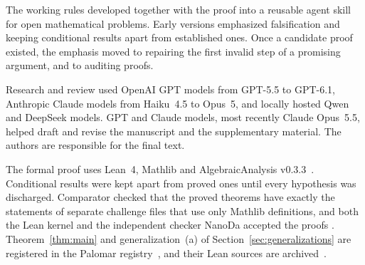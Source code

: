 \documentclass[pdflatex,sn-mathphys-num]{sn-jnl}
\numberwithin{equation}{section}
\theoremstyle{thmstyleone}
\theoremstyle{thmstyletwo}
\begin{document}
\begin{appendices}
The working rules developed together with the proof into a reusable
agent skill for open mathematical problems. Early versions emphasized
falsification and keeping conditional results apart from established ones.
Once a candidate proof existed, the emphasis moved to repairing the first
invalid step of a promising argument, and
to auditing proofs.

Research and review used OpenAI GPT models from GPT-5.5 to GPT-6.1,
Anthropic Claude models from Haiku~4.5 to Opus~5, and locally hosted Qwen
and DeepSeek models. GPT and Claude models, most recently Claude Opus~5.5,
helped draft and revise the manuscript and the supplementary material. The
authors are responsible for the final text.

The formal proof uses Lean~4, Mathlib and AlgebraicAnalysis
v0.3.3~\cite{Lean4,Mathlib2020,AlgebraicAnalysis033}. Conditional results
were kept apart from proved ones until every hypothesis was discharged.
Comparator checked that the proved theorems have exactly the statements of
separate challenge files that use only Mathlib definitions, and both the Lean
kernel and the independent checker NanoDa accepted the proofs
\cite{Comparator,NanoDa,PalomarDocs}. Theorem~\ref{thm:main} and
generalization~(a) of Section~\ref{sec:generalizations} are registered in the
Palomar registry~\cite{Stafford38Palomar2026,GlobalStaffordPalomar2026}, and
their Lean sources are archived~\cite{Stafford38Zenodo140,GlobalStaffordZenodo106}.

\end{appendices}



\end{document}

